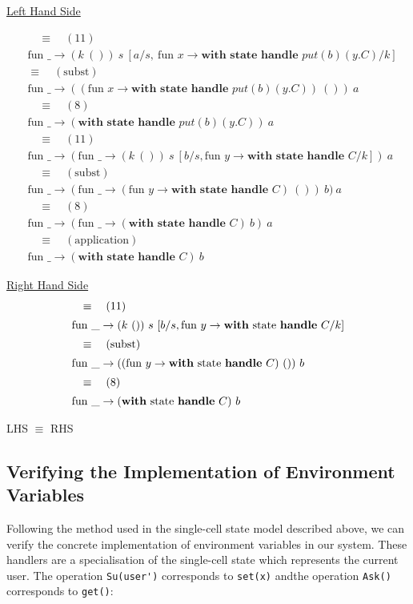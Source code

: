 \documentclass[logo,bsc,singlespacing,parskip]{infthesis}
\begin{document}
\underline{Left Hand Side}


\begin{align*}
&\quad\equiv\quad (11) \\
&\text{fun } \_ \rightarrow (k\ ())\ s\ [a/s,\ \text{fun } x \rightarrow \textbf{with state handle } put(b)(y.C)/k] \\
&\equiv\quad (\text{subst}) \\
&\text{fun } \_ \rightarrow ((\text{fun } x \rightarrow \textbf{with state handle } put(b)(y.C))\ ())\ a \\
&\quad\equiv\quad (8) \\
&\text{fun } \_ \rightarrow (\textbf{with state handle } put(b)(y.C))\ a \\
&\quad\equiv\quad (11) \\
&\text{fun } \_ \rightarrow (\text{fun } \_ \rightarrow (k\ ())\ s\ [b/s, \text{fun } y \rightarrow \textbf{with state handle } C/k])\ a \\
&\quad\equiv\quad (\text{subst}) \\
&\text{fun } \_ \rightarrow (\text{fun } \_ \rightarrow (\text{fun } y \rightarrow \textbf{with state handle } C)\ ())\ b)\ a \\
&\quad\equiv\quad (8) \\
&\text{fun } \_ \rightarrow (\text{fun } \_ \rightarrow (\textbf{with state handle } C)\ b)\ a \\
&\quad\equiv\quad (\text{application}) \\
&\text{fun } \_ \rightarrow (\textbf{with state handle } C)\ b
\end{align*}


\underline{Right Hand Side}
\[ 
\begin{array}{l}
\quad\equiv\quad (11) \\[5pt]
\text{fun }\_ \rightarrow (k\ ())\ s\ [b/s, \text{fun } y \rightarrow \text{\textbf{with} state \textbf{handle} } C/k] \\[5pt]
\quad\equiv\quad (\text{subst}) \\[5pt]
\text{fun }\_ \rightarrow ((\text{fun } y \rightarrow \text{\textbf{with} state \textbf{handle} } C)\ ())\ b \\[5pt]
\quad\equiv\quad (8) \\[5pt]
\text{fun }\_ \rightarrow (\text{\textbf{with} state \textbf{handle} } C)\ b
\end{array}
\]

LHS $\equiv$ RHS



\subsection{Verifying the Implementation of Environment Variables}
Following the method used in the single-cell state model described above, we can verify the concrete implementation of environment variables in our system. These handlers are a specialisation of the single-cell state which represents the current user. The operation \lstinline{Su(user')} corresponds to \lstinline{set(x)} andthe operation \lstinline{Ask()} corresponds to \lstinline{get()}:
\end{document}
